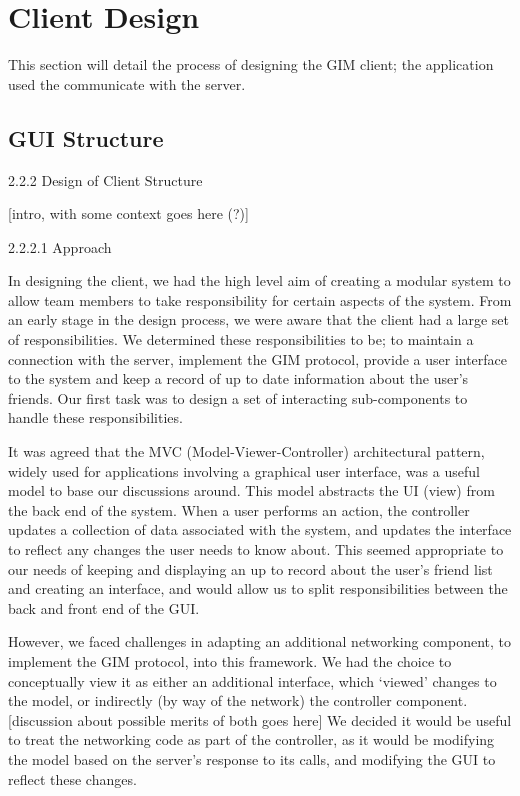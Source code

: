 \section{Client Design}

This section will detail the process of designing the GIM client; the application used the communicate with the server.

\subsection{GUI Structure}
2.2.2 Design of Client Structure

[intro, with some context goes here (?)]

2.2.2.1 Approach

In designing the client, we had the high level aim of creating a modular system to allow team members to take responsibility for certain aspects of the system. From an early stage in the design process, we were aware that the client had a large set of responsibilities. We determined these responsibilities to be;  to maintain a connection with the server, implement the GIM protocol, provide a user interface to the system and keep a record of up to date information about the user’s friends. Our first task was to design a set of interacting sub-components to handle these responsibilities.

It was agreed that the MVC (Model-Viewer-Controller) architectural pattern, widely used for applications involving a graphical user interface, was a useful model to base our discussions around. This model abstracts the UI (view) from the back end of the system. When a user performs an action, the controller updates a collection of data associated with the system, and updates the interface to reflect any changes the user needs to know about. This seemed appropriate to our needs of keeping and displaying an up to record about the user’s friend list and creating an interface, and would allow us to split responsibilities between the back and front end of the GUI. 

However, we faced challenges in adapting an additional networking component, to implement the GIM protocol, into this framework. We had the choice to conceptually view it as either an additional interface, which ‘viewed’ changes to the model, or indirectly (by way of the network) the controller component. [discussion about possible merits of both goes here] We decided it would be useful to treat the networking code as part of the controller, as it would be modifying the model based on the server’s response to its calls, and modifying the GUI to reflect these changes.
	
